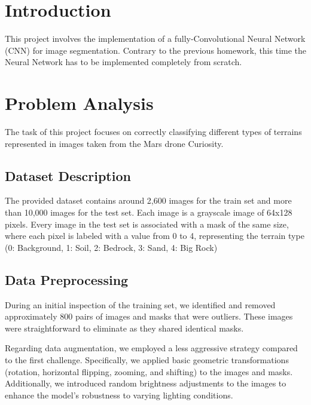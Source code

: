 \documentclass[11pt]{article}
\begin{document}
\begin{multicols}{2}

    \section{Introduction}
    This project involves the implementation of a fully-Convolutional Neural Network (CNN) for image segmentation. Contrary to the previous homework, this time the Neural Network has to be implemented completely from scratch.

    \section{Problem Analysis}

    The task of this project focuses on correctly classifying different types of terrains represented in images taken from the Mars drone Curiosity.

    \subsection{Dataset Description}

    The provided dataset contains around 2,600 images for the train set and more than 10,000 images for the test set. Each image is a grayscale image of 64x128 pixels. Every image in the test set is associated with a mask of the same size, where each pixel is labeled with a value from 0 to 4, representing the terrain type (0: Background, 1: Soil, 2: Bedrock, 3: Sand, 4: Big Rock)

    \subsection{Data Preprocessing}

    During an initial inspection of the training set, we identified and removed approximately 800 pairs of images and masks that were outliers. These images were straightforward to eliminate as they shared identical masks.

    Regarding data augmentation, we employed a less aggressive strategy compared to the first challenge. Specifically, we applied basic geometric transformations (rotation, horizontal flipping, zooming, and shifting) to the images and masks. Additionally, we introduced random brightness adjustments to the images to enhance the model's robustness to varying lighting conditions.


\end{multicols}
\end{document}
